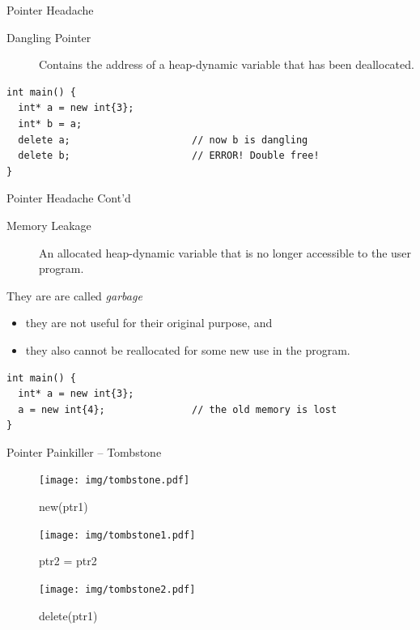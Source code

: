 \documentclass[presentation]{beamer}
\begin{document}
\begin{frame}[fragile,label={sec:orgheadline52}]{Pointer Headache}
 \begin{description}
\item[{Dangling Pointer}] Contains the address of a heap-dynamic
variable that has been deallocated.
\end{description}


\begin{verbatim}
int main() {
  int* a = new int{3};
  int* b = a;
  delete a;                     // now b is dangling
  delete b;                     // ERROR! Double free!
}
\end{verbatim}
\end{frame}

\begin{frame}[fragile,label={sec:orgheadline53}]{Pointer Headache Cont'd}
 \begin{description}
\item[{Memory Leakage}] An allocated heap-dynamic variable that is no
longer accessible to the user program.
\end{description}


They are are called \emph{garbage}
\begin{itemize}
\item they are not useful for their original purpose, and
\item they also cannot be reallocated for some new use in the program.
\end{itemize}


\begin{verbatim}
int main() {
  int* a = new int{3};
  a = new int{4};               // the old memory is lost
}
\end{verbatim}
\end{frame}

\begin{frame}[label={sec:orgheadline54}]{Pointer Painkiller -- Tombstone}
\begin{figure}[htb]
\centering
\texttt{[image: img/tombstone.pdf]}
\caption{new(ptr1)}
\end{figure}

\begin{figure}[htb]
\centering
\texttt{[image: img/tombstone1.pdf]}
\caption{ptr2 = ptr2}
\end{figure}

\begin{figure}[htb]
\centering
\texttt{[image: img/tombstone2.pdf]}
\caption{delete(ptr1)}
\end{figure}
\end{frame}
\end{document}
